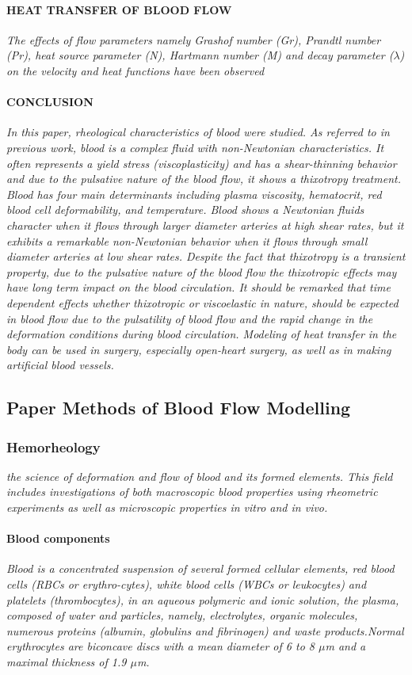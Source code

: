 \documentclass[11pt,letterpaper]{article}
\begin{document}
\paragraph{HEAT TRANSFER OF BLOOD FLOW}
\textit{The effects of flow parameters namely Grashof number (Gr), Prandtl number (Pr), heat source parameter (N), Hartmann number (M) and decay parameter ($\lambda$) on the velocity and heat functions have been observed}
\paragraph{CONCLUSION} \textit{In this paper, rheological characteristics of blood were studied. As referred to in previous work, blood is a complex fluid with non-Newtonian characteristics. It often represents a yield stress (viscoplasticity) and has a shear-thinning behavior and due to the pulsative nature of the blood flow, it shows a thixotropy treatment. Blood has four main determinants including plasma viscosity, hematocrit, red blood cell deformability, and temperature. Blood shows a Newtonian fluids character when it flows through larger diameter arteries at high shear rates, but it exhibits a remarkable non-Newtonian behavior when it flows through small diameter arteries at low shear rates. Despite the fact that thixotropy is a transient property, due to the pulsative nature of the blood flow the thixotropic effects may have long term impact on the blood circulation. It should be remarked that time dependent effects whether thixotropic or viscoelastic in nature, should be expected in blood flow due to the pulsatility of blood flow and the rapid change in the deformation conditions during blood circulation. Modeling of heat transfer in the body can be used in surgery, especially open-heart surgery, as well as in making artificial blood vessels.}
\newpage
\subsection{Paper Methods of Blood Flow Modelling}
\subsubsection*{Hemorheology}
\textit{ the science of deformation and flow of blood and its formed elements. This field includes investigations of both macroscopic blood properties using rheometric experiments as well as microscopic properties in vitro and in vivo. }
\paragraph{Blood components} 
\textit{Blood is a concentrated suspension of several formed cellular elements, red blood cells (RBCs or erythro-cytes), white blood cells (WBCs or leukocytes) and platelets (thrombocytes), in an aqueous polymeric and ionic solution, the plasma, composed of  water and particles, namely, electrolytes, organic
molecules, numerous proteins (albumin, globulins and fibrinogen) and waste products.\newline [...] 
Normal erythrocytes are biconcave discs with a mean
diameter of 6 to 8 $\mu$m and a maximal thickness of 1.9 $\mu$m.}
\end{document}
